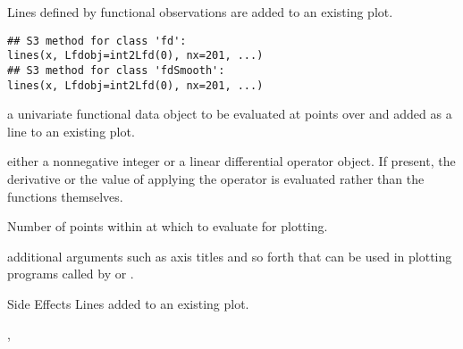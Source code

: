 \documentclass{article}
\begin{document}
\begin{Description}\relax
Lines defined by functional observations are added to an existing plot.
\end{Description}
\begin{Usage}
\begin{verbatim}
## S3 method for class 'fd':
lines(x, Lfdobj=int2Lfd(0), nx=201, ...)
## S3 method for class 'fdSmooth':
lines(x, Lfdobj=int2Lfd(0), nx=201, ...)
\end{verbatim}
\end{Usage}
\begin{Arguments}
\begin{ldescription}
\item[\code{x}] a univariate functional data object to be evaluated at 
points over  and added as a line to an existing plot.  

\item[\code{Lfdobj}] either a nonnegative integer or a linear differential operator
object.  If present, the derivative or the value of applying the
operator is evaluated rather than the functions themselves.

\item[\code{nx}] Number of points within  at which to evaluate 
for plotting.  

\item[\code{... }] additional arguments such as axis titles and so forth that can be
used in plotting programs called by  or
.  

\end{ldescription}
\end{Arguments}
\begin{Section}{Side Effects}
Lines added to an existing plot.
\end{Section}
\begin{SeeAlso}\relax
{}, 
\end{SeeAlso}
\end{document}
